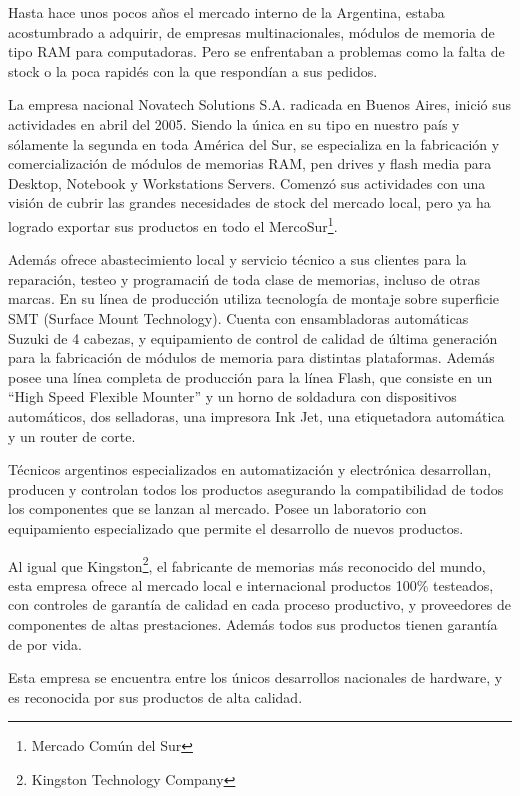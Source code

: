\documentclass[%
 	final,
%
	notitlepage,
	narroweqnarray,
	inline,
 	twoside,
	]{ieee}
\begin{document}
Hasta hace unos pocos a\~nos el mercado interno de la Argentina, estaba acostumbrado a adquirir, de empresas multinacionales, m\'odulos de memoria de tipo RAM para computadoras. Pero se enfrentaban a problemas como la falta de stock o la poca rapid\'es con la que respond\'ian a sus pedidos.

La empresa nacional Novatech Solutions S.A. radicada en Buenos Aires, inici\'o sus actividades en abril del 2005. Siendo la \'unica en su tipo en nuestro pa\'is y s\'olamente la segunda en toda Am\'erica del Sur, se especializa en la fabricaci\'on y comercializaci\'on de m\'odulos de memorias RAM, pen drives y flash media para Desktop, Notebook y Workstations Servers. Comenz\'o sus actividades con una visi\'on de cubrir las grandes necesidades de stock del mercado local, pero ya ha logrado exportar sus productos en todo el MercoSur\footnote{Mercado Com\'un del Sur\cite{mercosur}}.

Adem\'as ofrece abastecimiento local y servicio t\'ecnico a sus clientes para la reparaci\'on, testeo y programaci\'n de toda clase de memorias, incluso de otras marcas. En su l\'inea de producci\'on utiliza tecnolog\'ia de montaje sobre superficie SMT (Surface Mount Technology). Cuenta con ensambladoras autom\'aticas Suzuki de 4 cabezas, y equipamiento de control de calidad de \'ultima generaci\'on para la fabricaci\'on de m\'odulos de memoria para distintas plataformas. Adem\'as posee una l\'inea completa de producci\'on para la l\'inea Flash, que consiste en un ``High Speed Flexible Mounter'' y un horno de soldadura con dispositivos autom\'aticos, dos selladoras, una impresora Ink Jet, una etiquetadora autom\'atica y un router de corte.

T\'ecnicos argentinos especializados en automatizaci\'on y electr\'onica desarrollan, producen y controlan todos los productos asegurando la compatibilidad de todos los componentes que se lanzan al mercado. Posee un laboratorio con equipamiento especializado que permite el desarrollo de nuevos productos.

Al igual que Kingston\footnote{Kingston Technology Company\cite{kingston}}, el fabricante de memorias m\'as reconocido del mundo, esta empresa ofrece al mercado local e internacional productos 100\% testeados, con controles de garant\'ia de calidad en cada proceso productivo, y proveedores de componentes de altas prestaciones. Adem\'as todos sus productos tienen garant\'ia de por vida.

Esta empresa se encuentra entre los \'unicos desarrollos nacionales de hardware, y es reconocida por sus productos de alta calidad.
\end{document}

